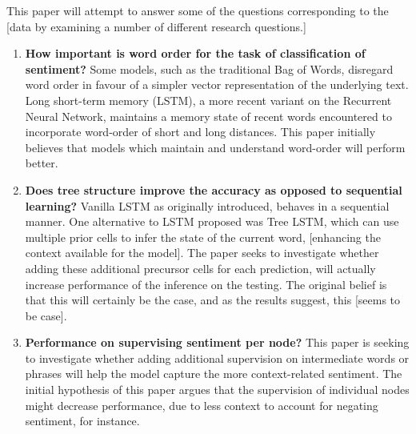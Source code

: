 This paper will attempt to answer some of the questions corresponding to the
[data by examining a number of different research questions.]
\begin{enumerate}
    \item \textbf{How important is word order for the task of classification of
    sentiment?} Some models, such as the traditional Bag of Words, disregard
    word order in favour of a simpler vector representation of the underlying
    text. Long short-term memory (LSTM), a more recent variant on the Recurrent
    Neural Network, maintains a memory state of recent words encountered to
    incorporate word-order of short and long distances. This paper initially
    believes that models which maintain and understand word-order will perform
    better. 
    \item \textbf{Does tree structure improve the accuracy as opposed to
    sequential learning?} Vanilla LSTM as originally introduced, behaves in a
    sequential manner. One alternative to LSTM proposed was Tree LSTM, which can
    use multiple prior cells to infer the state of the current word, [enhancing
    the context available for the model]. The paper seeks to investigate whether
    adding these additional precursor cells for each prediction, will actually
    increase performance of the inference on the testing. The original belief is
    that this will certainly be the case, and as the results suggest, this
    [seems to be case].
    \item \textbf{Performance on supervising sentiment per node?}
    This paper is seeking to investigate whether adding additional supervision
    on intermediate words or phrases will help the model capture the more
    context-related sentiment. The initial hypothesis of this paper argues that
    the supervision of individual nodes might decrease performance, due to less
    context to account for negating sentiment, for instance.

\end{enumerate}
